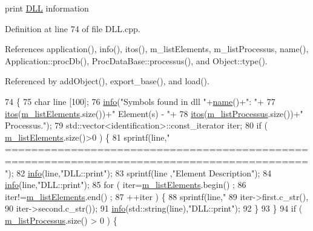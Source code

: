 print \hyperlink{classDLL}{D\+LL} information 

Definition at line 74 of file D\+L\+L.\+cpp.



References application(), info(), itos(), m\+\_\+list\+Elements, m\+\_\+list\+Processus, name(), Application\+::proc\+Db(), Proc\+Data\+Base\+::processus(), and Object\+::type().



Referenced by add\+Object(), export\+\_\+base(), and load().


\begin{DoxyCode}
74                   \{
75   \textcolor{keywordtype}{char} line [100];
76   \hyperlink{classDLL_a2b7ea0c85b83a1dec03e4fce13c0d5d2}{info}(\textcolor{stringliteral}{"Symbols found in dll "}+\hyperlink{classDLL_a0a915d538771dde2cb0580cd340ee088}{name}()+\textcolor{stringliteral}{": "}+
77          \hyperlink{Tools_8h_af330027dbdafb9a30768b3613c553e60}{itos}(\hyperlink{classDLL_a2e88d7167245fd7b6a000817583643ed}{m\_listElements}.size())+\textcolor{stringliteral}{" Element(s) - "}+
78          \hyperlink{Tools_8h_af330027dbdafb9a30768b3613c553e60}{itos}(\hyperlink{classDLL_a197e92b990184a27a74f4a0456897bd5}{m\_listProcessus}.size())+\textcolor{stringliteral}{" Processus."});
79   std::vector<identification>::const\_iterator iter;
80   \textcolor{keywordflow}{if} ( \hyperlink{classDLL_a2e88d7167245fd7b6a000817583643ed}{m\_listElements}.size()>0 ) \{
81     sprintf(line,\textcolor{stringliteral}{"
      ============================================================================================"});
82     \hyperlink{classDLL_a2b7ea0c85b83a1dec03e4fce13c0d5d2}{info}(line,\textcolor{stringliteral}{"DLL::print"});
83     sprintf(line ,\textcolor{stringliteral}{"Element                    Description"});
84     \hyperlink{classDLL_a2b7ea0c85b83a1dec03e4fce13c0d5d2}{info}(line,\textcolor{stringliteral}{"DLL::print"});
85     \textcolor{keywordflow}{for} ( iter=\hyperlink{classDLL_a2e88d7167245fd7b6a000817583643ed}{m\_listElements}.begin() ;
86       iter!=\hyperlink{classDLL_a2e88d7167245fd7b6a000817583643ed}{m\_listElements}.end() ;
87       ++iter ) \{
88       sprintf(line,\textcolor{stringliteral}{" %
89           iter->first.c\_str(),
90           iter->second.c\_str());
91       \hyperlink{classDLL_a2b7ea0c85b83a1dec03e4fce13c0d5d2}{info}(std::string(line),\textcolor{stringliteral}{"DLL::print"});
92     \}
93   \}
94   \textcolor{keywordflow}{if} ( \hyperlink{classDLL_a197e92b990184a27a74f4a0456897bd5}{m\_listProcessus}.size() > 0 ) \{
}
\end{DoxyCode}
